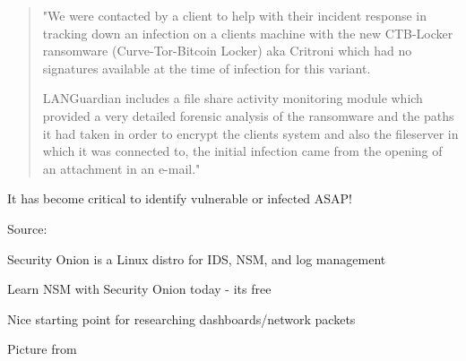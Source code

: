 \documentclass[20pt,landscape,a4paper,footrule]{foils}
\begin{document}


\begin{quote}
"We were contacted by a client to help with their incident response in tracking down an
infection on a clients machine with the new CTB-Locker ransomware (Curve-Tor-Bitcoin Locker)
aka Critroni which had no signatures available at the time of infection for this variant.

LANGuardian includes a file share activity monitoring module which provided a very
detailed forensic analysis of the ransomware and the paths it had taken in order to
encrypt the clients system and also the fileserver in which it was connected to, the
initial infection came from the opening of an attachment in an e-mail."
\end{quote}

\vskip 1cm

\centerline{It has become critical to identify vulnerable or infected ASAP!}

Source:
{\tiny{}}



\begin{list2}
\item Security Onion is a Linux distro for IDS, NSM, and log management
\item Learn NSM with Security Onion today - its free
\end{list2}

\centerline{Nice starting point for researching dashboards/network packets}



Picture from 

\end{document}

